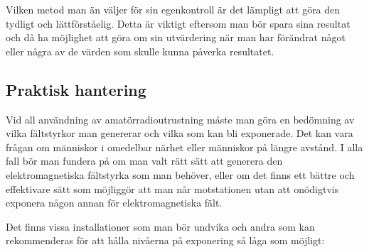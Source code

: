 Vilken metod man än väljer för sin egenkontroll är det lämpligt att
göra den tydligt och lättförståelig.
Detta är viktigt eftersom man bör spara sina resultat och då ha möjlighet att
göra om sin utvärdering när man har förändrat något eller några av de värden
som skulle kunna påverka resultatet.

\subsection{Praktisk hantering}
Vid all användning av amatörradioutrustning måste man göra en bedömning
av vilka fältstyrkor man genererar och vilka som kan bli exponerade.
Det kan vara frågan om människor i omedelbar närhet eller människor på
längre avstånd.
I alla fall bör man fundera på om man valt rätt sätt att generera den
elektromagnetiska fältstyrka som man behöver, eller om det finns ett bättre
och effektivare sätt som möjliggör att man når motstationen utan att onödigtvis
exponera någon annan för elektromagnetiska fält.

Det finns vissa installationer som man bör undvika och andra som kan
rekommenderas för att hålla nivåerna på exponering så låga som möjligt:

